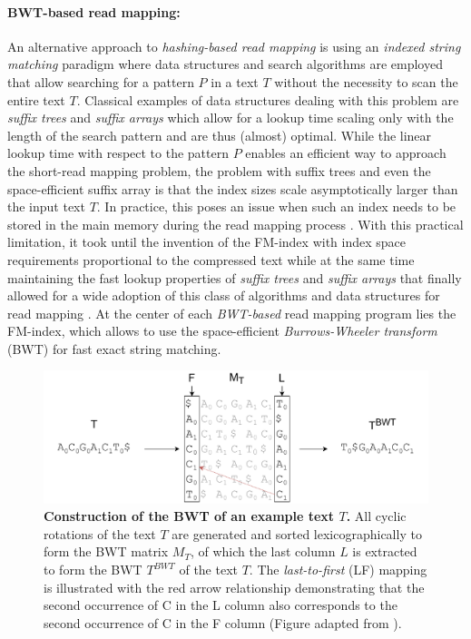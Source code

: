 \paragraph{BWT-based read mapping:} An alternative approach to \textit{hashing-based read mapping} is using an \textit{indexed string matching} paradigm where data structures and search algorithms are employed that allow searching for a pattern $P$ in a text $T$ without the necessity to scan the entire text $T$. Classical examples of data structures dealing with this problem are \textit{suffix trees} \citep{Apostolico1985} and \textit{suffix arrays} \citep{Manber1993} which allow for a lookup time scaling only with the length of the search pattern and are thus (almost) optimal. While the linear lookup time with respect to the pattern $P$ enables an efficient way to approach the short-read mapping problem, the problem with suffix trees and even the space-efficient suffix array is that the index sizes scale asymptotically larger than the input text $T$. In practice, this poses an issue when such an index needs to be stored in the main memory during the read mapping process \citep{Canzar2015}. With this practical limitation, it took until the invention of the FM-index \citep{Ferragina2005IndexingText}  with index space requirements proportional to the compressed text while at the same time maintaining the fast lookup properties of \textit{suffix trees} and \textit{suffix arrays} that finally allowed for a wide adoption of this class of algorithms and data structures for read mapping \citep{Canzar2015}. At the center of each \textit{BWT-based} read mapping program lies the FM-index, which allows to use the space-efficient \textit{Burrows-Wheeler transform} (BWT) \citep{Burrows94ablock-sorting} for fast exact string matching.

\begin{figure}[h]
	 \centering
	 \includegraphics[width=1\linewidth]{img/chapter1/BWT}
	  \caption[Construction of the BWT of an example text $T$]{\textbf{Construction of the BWT of an example text $T$.} All cyclic rotations of the text $T$ are generated and sorted lexicographically to form the BWT matrix $M_T$, of which the last column $L$ is extracted to form the BWT $T^{BWT}$ of the text $T$. The \textit{last-to-first} (LF) mapping is illustrated with the red arrow relationship demonstrating that the second occurrence of C in the L column also corresponds to the second occurrence of C in the F column (Figure adapted from \citeauthor{Canzar2015} \citep{Canzar2015}).}
	 \label{fig:BWT}
\end{figure}

